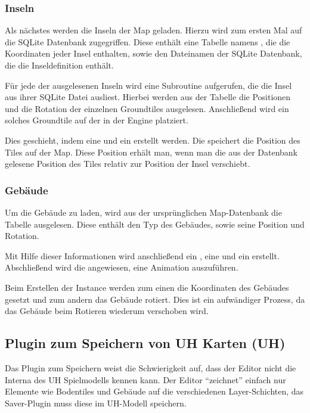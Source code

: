 \subsubsection{Inseln}
Als nächstes werden die Inseln der Map geladen. Hierzu wird zum ersten
Mal auf die SQLite Datenbank zugegriffen. Diese enthält eine Tabelle
namens , die die Koordinaten jeder Insel enthalten, sowie
den Dateinamen der SQLite Datenbank, die die Inseldefinition enthält.

Für jede der ausgelesenen Inseln wird eine Subroutine aufgerufen, die
die Insel aus ihrer SQLite Datei ausliest. Hierbei werden aus der
 Tabelle die Positionen und die Rotation der einzelnen
Groundtiles ausgelesen. Anschließend wird ein solches Groundtile
auf der  in der Engine platziert.

Dies geschieht, indem eine  und ein 
erstellt werden. Die  speichert die Position des Tiles
auf der Map. Diese Position erhält man, wenn man die aus der Datenbank
gelesene Position des Tiles relativ zur Position der Insel verschiebt.

\subsubsection{Gebäude}
Um die Gebäude zu laden, wird aus der ursprünglichen Map-Datenbank
die Tabelle  ausgelesen. Diese enthält den Typ des Gebäudes,
sowie seine Position und Rotation.

Mit Hilfe dieser Informationen wird anschließend ein , eine
 und ein  erstellt. Abschließend
wird die  angewiesen, eine Animation auszuführen.

Beim Erstellen der Instance werden zum einen die Koordinaten des Gebäudes
gesetzt und zum andern das Gebäude rotiert. Dies ist ein aufwändiger
Prozess, da das Gebäude beim Rotieren wiederum verschoben wird.


\subsection{Plugin zum Speichern von UH Karten (UH)}
Das Plugin zum Speichern weist die Schwierigkeit auf, dass der Editor nicht die
Interna des UH Spielmodells kennen kann. Der Editor ``zeichnet'' einfach nur
Elemente wie Bodentiles und Gebäude auf die verschiedenen Layer-Schichten, das
Saver-Plugin muss diese im UH-Modell speichern.

